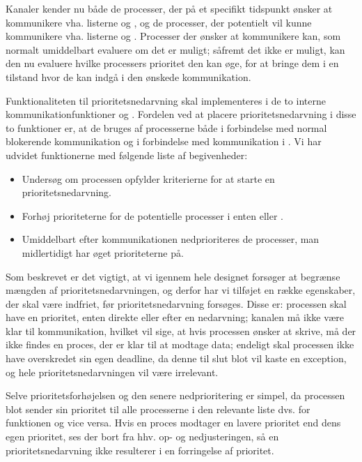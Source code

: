 Kanaler kender nu  både de processer, der på et specifikt tidspunkt ønsker at kommunikere vha. listerne  og , og de processer, der potentielt vil kunne kommunikere vha. listerne  og . Processer der ønsker at kommunikere kan, som normalt umiddelbart evaluere om det er muligt; såfremt det ikke er muligt, kan den nu evaluere hvilke processers prioritet den kan øge, for at bringe dem i en tilstand hvor de kan indgå i den ønskede kommunikation. 

Funktionaliteten til prioritetsnedarvning skal implementeres i de to interne kommunikationfunktioner   og . Fordelen ved at placere prioritetsnedarvning i disse to funktioner er, at de bruges af processerne både i forbindelse med normal blokerende kommunikation og i forbindelse med kommunikation i . Vi har udvidet funktionerne med følgende liste af begivenheder:
\begin{itemize}
\tightlist
	\item Undersøg om processen opfylder kriterierne for at starte en prioritetsnedarvning.
	\item Forhøj prioriteterne for de potentielle processer i enten  eller .
	\item Umiddelbart efter kommunikationen nedprioriteres de processer, man midlertidigt har øget prioriteterne på.
\end{itemize}

Som beskrevet er det vigtigt, at vi igennem hele designet forsøger at begrænse mængden af prioritetsnedarvningen, og derfor har vi tilføjet en række egenskaber, der skal være indfriet, før prioritetsnedarvning forsøges. Disse er: processen skal have en prioritet, enten direkte eller efter en nedarvning; kanalen må ikke være klar til kommunikation, hvilket vil sige, at hvis processen ønsker at skrive, må der ikke findes en proces, der er klar til at modtage data; endeligt skal processen ikke have overskredet sin egen deadline, da denne til slut blot vil kaste en exception, og hele prioritetsnedarvningen vil være irrelevant.

Selve prioritetsforhøjelsen og den senere nedprioritering er simpel, da processen blot sender sin prioritet til alle processerne i den relevante liste dvs.  for   funktionen og vice versa. Hvis en proces modtager en lavere prioritet end dens egen prioritet, ses der bort fra hhv. op- og nedjusteringen, så en prioritetsnedarvning ikke resulterer i en forringelse af prioritet. 

